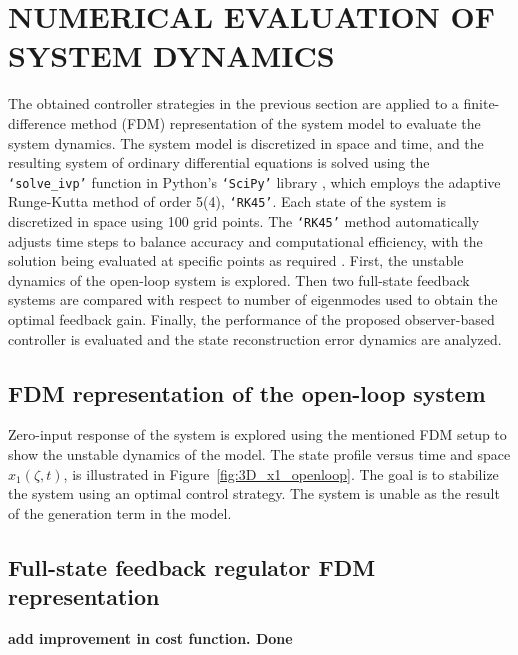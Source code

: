 \section{NUMERICAL EVALUATION OF SYSTEM DYNAMICS}

The obtained controller strategies in the previous section are applied to a finite-difference method (FDM) representation of the system model to evaluate the system dynamics. The system model is discretized in space and time, and the resulting system of ordinary differential equations is solved using the \texttt{`solve\_ivp'} function in Python's \texttt{`SciPy'} library \autocite{2020SciPy}, which employs the adaptive Runge-Kutta method of order 5(4), \texttt{`RK45'}. Each state of the system is discretized in space using 100 grid points. The \texttt{`RK45'} method automatically adjusts time steps to balance accuracy and computational efficiency, with the solution being evaluated at specific points as required \autocite{RK45_1,RK45_2}. First, the unstable dynamics of the open-loop system is explored. Then two full-state feedback systems are compared with respect to number of eigenmodes used to obtain the optimal feedback gain. Finally, the performance of the proposed observer-based controller is evaluated and the state reconstruction error dynamics are analyzed.

\subsection{FDM representation of the open-loop system}

Zero-input response of the system is explored using the mentioned FDM setup to show the unstable dynamics of the model. The state profile versus time and space $x_1(\zeta,t)$, is illustrated in Figure~\ref{fig:3D_x1_openloop}. The goal is to stabilize the system using an optimal control strategy. The system is unable as the result of the generation term in the model.

\subsection{Full-state feedback regulator FDM representation}

\textbf{add improvement in cost function. Done}


